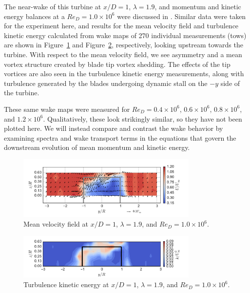 \documentclass[energies,article,accept,moreauthors,pdftex,12pt,a4paper]{mdpi}
\begin{document}
The near-wake of this turbine at $x/D=1$, $\lambda=1.9$, and momentum and
kinetic energy balances at a $Re_D = 1.0 \times 10^6$ were discussed in
\cite{Bachant2015-JoT}. Similar data were taken for the experiment here, and
results for the mean velocity field and turbulence kinetic energy calculated
from wake maps of 270 individual measurements (tows) are shown in
Figure~\ref{fig:meancontquiv} and Figure~\ref{fig:kcont}, respectively, looking
upstream towards the turbine. With respect to the mean velocity field, we see
asymmetry and a mean vortex structure created by blade tip vortex shedding. The
effects of the tip vortices are also seen in the turbulence kinetic energy
measurements, along with turbulence generated by the blades undergoing dynamic
stall on the $-y$ side of the turbine.

These same wake maps were measured for $Re_D = 0.4 \times 10^6$, $0.6 \times
10^6$, $0.8 \times 10^6$, and $1.2 \times 10^6$. Qualitatively, these look
strikingly similar, so they have not been plotted here. We will instead compare
and contrast the wake behavior by examining spectra and wake transport terms in
the equations that govern the downstream evolution of mean momentum and kinetic
energy.

\begin{figure}[ht!]
\centering

\includegraphics[width=0.8\textwidth]{figures/meancontquiv_10}

\caption{Mean velocity field at $x/D=1$, $\lambda=1.9$, and $Re_D=1.0 \times
    10^6$.}

\label{fig:meancontquiv}
\end{figure}

\begin{figure}[ht!]
\centering

\includegraphics[width=0.8\textwidth]{figures/k_contours_10}

\caption{Turbulence kinetic energy at $x/D=1$, $\lambda=1.9$, and $Re_D=1.0
    \times 10^6$.}

\label{fig:kcont}
\end{figure}
\end{document}
